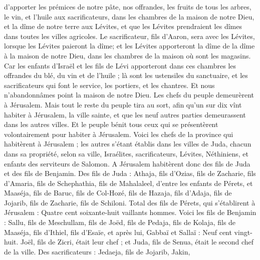 \begin{multicols}{2}
d’apporter les prémices de notre pâte, nos offrandes, les fruits de tous les arbres, le vin, et l'huile aux sacrificateurs, dans les chambres de la maison de notre Dieu, et la dîme de notre terre aux Lévites, et que les Lévites prendraient les dîmes dans toutes les villes agricoles.
Le sacrificateur, fils d'Aaron, sera avec les Lévites, lorsque les Lévites paieront la dîme; et les Lévites apporteront la dîme de la dîme à la maison de notre Dieu, dans les chambres de la maison où sont les magasins.
Car les enfants d'Israël et les fils de Lévi apporteront dans ces chambres les offrandes du blé, du vin et de l'huile ; là sont les ustensiles du sanctuaire, et les sacrificateurs qui font le service, les portiers, et les chantres. Et nous n'abandonnâmes point la maison de notre Dieu.
\VerseOne{}Les chefs du peuple demeurèrent à Jérusalem.  Mais tout le reste du peuple tira au sort, afin qu'un sur dix vînt habiter à Jérusalem, la ville sainte, et que les neuf autres parties demeurassent dans les autres villes.
Et le peuple bénit tous ceux qui se présentèrent volontairement pour habiter à Jérusalem.
Voici les chefs de la province qui habitèrent à Jérusalem ; les autres s'étant établis dans les villes de Juda, chacun dans sa propriété, selon sa ville, Israélites, sacrificateurs, Lévites, Néthiniens, et enfants des serviteurs de Salomon.
A Jérusalem habitèrent donc des fils de Juda et des fils de Benjamin. Des fils de Juda : Athaja, fils d'Ozias, fils de Zacharie, fils d'Amaria, fils de Schephathia, fils de Mahalaleel, d'entre les enfants de Pérets,
et Maaséja, fils de Baruc, fils de Col-Hozé, fils de Hazaja, fils d'Adaja, fils de Jojarib, fils de Zacharie, fils de Schiloni.
Total des fils de Pérets, qui s'établirent à Jérusalem : Quatre cent soixante-huit vaillants hommes.
Voici les fils de Benjamin : Sallu, fils de Meschullam, fils de Joëd, fils de Pedaja, fils de Kolaja, fils de Maaséja, fils d'Ithiel, fils d'Esaïe,
et après lui, Gabbaï et Sallaï : Neuf cent vingt-huit.
Joël, fils de Zicri, était leur chef ; et Juda, fils de Senua, était le second chef de la ville.
Des sacrificateurs : Jedaeja, fils de Jojarib, Jakin,

\end{multicols}

